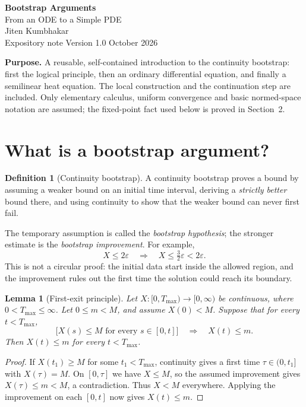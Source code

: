 \documentclass[a4paper,10pt]{article}
\numberwithin{equation}{section}
\newtheorem{lemma}[theorem]{Lemma}
\theoremstyle{definition}
\newtheorem{definition}[theorem]{Definition}
\theoremstyle{remark}
\newcommand{\Tmax}{T_{\max}}
\newcommand{\pageheading}[1]{\section{#1}}
\begin{document}
\thispagestyle{plain}
\begin{center}
{\LARGE\bfseries\color{navy}Bootstrap Arguments}\\[5pt]
{\large From an ODE to a Simple PDE}\\[8pt]
Jiten Kumbhakar\\[3pt]
{\small Expository note \;\textbullet\; Version 1.0 \;\textbullet{} October 2026}
\end{center}
\vspace{3pt}
\textbf{Purpose.} A reusable, self-contained introduction to the continuity bootstrap:
first the logical principle, then an ordinary differential equation, and finally a
semilinear heat equation. The local construction and the continuation step are
included. Only elementary calculus, uniform convergence and basic normed-space
notation are assumed; the fixed-point fact used below is proved in Section~2.

\pageheading{What is a bootstrap argument?}
\begin{definition}[Continuity bootstrap]
A continuity bootstrap proves a bound by assuming a weaker bound on an initial
time interval, deriving a \emph{strictly better} bound there, and using continuity
to show that the weaker bound can never first fail.
\end{definition}
The temporary assumption is called the \emph{bootstrap hypothesis}; the stronger
estimate is the \emph{bootstrap improvement}. For example,
\[
X\leq 2\varepsilon
\quad\Longrightarrow\quad
X\leq \tfrac32\varepsilon<2\varepsilon.
\]
This is not a circular proof: the initial data start inside the allowed region,
and the improvement rules out the first time the solution could reach its boundary.

\begin{lemma}[First-exit principle]\label{lem:exit}
Let $X:[0,\Tmax)\to[0,\infty)$ be continuous, where $0<\Tmax\leq\infty$.
Let $0\leq m<M$, and assume $X(0)<M$. Suppose that for every $t<\Tmax$,
\[
\bigl[X(s)\leq M\text{ for every }s\in[0,t]\bigr]
\quad\Longrightarrow\quad X(t)\leq m.
\]
Then $X(t)\leq m$ for every $t<\Tmax$.
\end{lemma}
\begin{proof}
If $X(t_1)\geq M$ for some $t_1<\Tmax$, continuity gives a first time
$\tau\in(0,t_1]$ with $X(\tau)=M$. On $[0,\tau]$ we have $X\leq M$, so the
assumed improvement gives $X(\tau)\leq m<M$, a contradiction. Thus $X<M$
everywhere. Applying the improvement on each $[0,t]$ now gives $X(t)\leq m$.
\end{proof}
\end{document}
